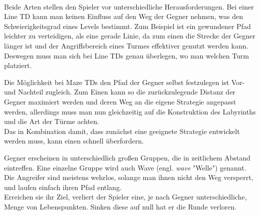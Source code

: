 ~\\
Beide Arten stellen den Spieler vor unterschiedliche Herausforderungen. Bei einer Line TD kann man keinen Einfluss auf den Weg der Gegner nehmen, was den Schwierigkeitsgrad eines Levels bestimmt. Zum Beispiel ist ein gewundener Pfad leichter zu verteidigen, als eine gerade Linie, da zum einen die Strecke der Gegner länger ist und der Angriffsbereich eines Turmes effektiver genutzt werden kann.\\
Deswegen muss man sich bei Line TDs genau überlegen, wo man welchen Turm platziert.

Die Möglichkeit bei Maze TDs den Pfad der Gegner selbst festzulegen ist Vor- und Nachteil zugleich. Zum Einen kann so die zurückzulegende Distanz der Gegner maximiert werden und deren Weg an die eigene Strategie angepasst werden, allerdings muss man nun gleichzeitig auf die Konstruktion des Labyrinths und die Art der Türme achten.\\
Das in Kombination damit, dass zunächst eine geeignete Strategie entwickelt werden muss, kann einen schnell überfordern.

Gegner erscheinen in unterschiedlich großen Gruppen, die in zeitlichem Abstand eintreffen. Eine einzelne Gruppe wird auch Wave (engl. \textit{wave} "Welle") genannt. Die Angreifer sind meistens wehrlos, solange man ihnen nicht den Weg versperrt, und laufen einfach ihren Pfad entlang.\\
Erreichen sie ihr Ziel, verliert der Spieler eine, je nach Gegner unterschiedliche, Menge von Lebenspunkten. Sinken diese auf null hat er die Runde verloren.

